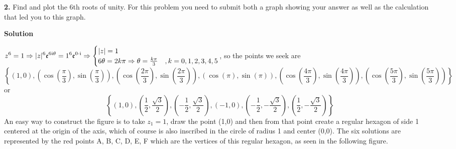 \documentclass[10.5pt]{amsart}
\newcommand{\dsp}{\displaystyle}
\begin{document}
\textbf{2.} Find and plot the 6th roots of unity. For this problem you need to submit both 
a graph showing your 
answer as well as the calculation that led you to this graph. 
\begin{center}
 \textbf{Solution}
\end{center}
$\dsp z^6=1\Rightarrow |z|^{6}\mathfrak{e}^{6\mi\theta}=1^{6}\mathfrak{e}^{0\cdot\mi}\Rightarrow 
\begin{cases}|z|=1&\\6\theta=2k\pi\Rightarrow 
\theta=\frac{k\pi}{3}&,k=0,1,2,3,4,5\end{cases}$, so the points we 
seek are
\[
\left\{(1,0),\left(\cos\left(\frac{\pi}{3}\right),\sin\left(\frac{\pi}{3}\right)\right),
\left(\cos\left(\frac{2\pi}{3}\right),\sin\left(\frac{2\pi}{3}\right)\right),
\left(\cos\left(\pi\right) 
,\sin\left(\pi\right)\right),\left(\cos\left(\frac{4\pi}{3}\right),
\sin\left(\frac{4\pi}{3}\right)\right),\left(\cos\left(\frac{5\pi}{3}\right),
\sin\left(\frac{5\pi}{3}
 \right)\right)\right\}
\]
or 
\[
 \left\{(1,0),\left(\frac{1}{2},\frac{\sqrt{3}}{2}\right),\left(-\frac{1}{2},\frac{\sqrt{3}}{2}\right),(-1,0),
 \left(-\frac{1}{2},-\frac{\sqrt{3}}{2}\right),\left(\frac{1}{2},-\frac{\sqrt{3}}{2}\right)\right\}
\]
An easy way to construct the figure is to take $z_1=1$, draw the point (1,0) and then from that point create a 
regular hexagon of side 1 centered at the origin of the axis, which of course is also 
inscribed in the circle 
of radius 1 and center (0,0). The six solutions are represented by the red points A, B, C, 
D, E, F which are 
the vertices of this regular hexagon, as seen in the following figure.
\end{document}

